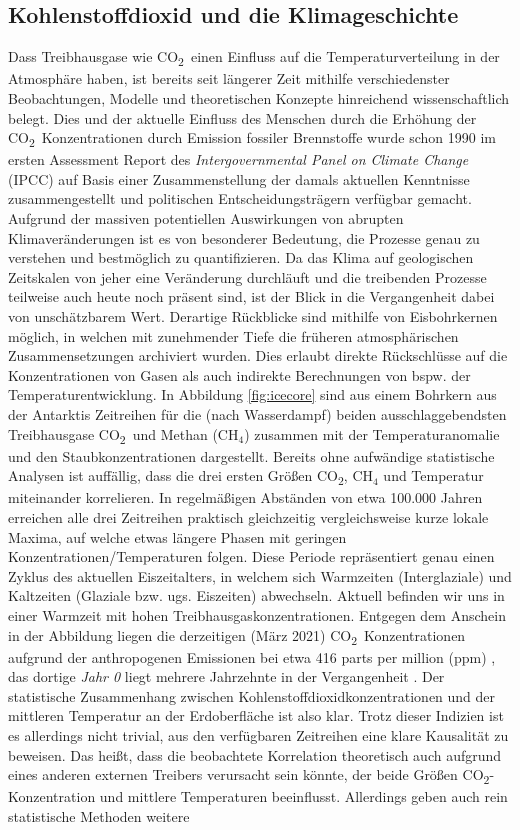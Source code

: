 \documentclass[12pt,a4paper,onecolumn,draft]{scrartcl}
\newcommand{\cotwo}{CO\textsubscript{2}}
\begin{document}
\subsection{Kohlenstoffdioxid und die Klimageschichte} \label{sec:Klima}
Dass Treibhausgase wie \cotwo \ einen Einfluss auf die Temperaturverteilung in der Atmosphäre haben, ist bereits seit längerer Zeit mithilfe verschiedenster Beobachtungen, Modelle und theoretischen Konzepte hinreichend wissenschaftlich belegt. Dies und der aktuelle Einfluss des Menschen durch die Erhöhung der \cotwo \ Konzentrationen durch Emission fossiler Brennstoffe wurde schon 1990 im ersten Assessment Report des \textit{Intergovernmental Panel on Climate Change} (IPCC) auf Basis einer Zusammenstellung der damals aktuellen Kenntnisse zusammengestellt und politischen Entscheidungsträgern verfügbar gemacht. Aufgrund der massiven potentiellen Auswirkungen von abrupten Klimaveränderungen \citep{IPCCpol.2018} ist es von besonderer Bedeutung, die Prozesse genau zu verstehen und bestmöglich zu quantifizieren. Da das Klima auf geologischen Zeitskalen von jeher eine Veränderung durchläuft und die  treibenden Prozesse teilweise auch heute noch präsent sind, ist der Blick in die Vergangenheit dabei von unschätzbarem Wert. Derartige Rückblicke sind mithilfe von Eisbohrkernen möglich, in welchen mit zunehmender Tiefe die früheren atmosphärischen Zusammensetzungen archiviert wurden. Dies erlaubt direkte Rückschlüsse auf die Konzentrationen von Gasen als auch indirekte Berechnungen von bspw. der Temperaturentwicklung. In Abbildung \ref{fig:icecore} sind aus einem Bohrkern aus der Antarktis Zeitreihen für die (nach Wasserdampf) beiden ausschlaggebendsten Treibhausgase \cotwo \ und Methan (CH$_4$) zusammen mit der Temperaturanomalie und den Staubkonzentrationen dargestellt. Bereits ohne aufwändige statistische Analysen ist auffällig, dass die drei ersten Größen \cotwo , CH$_4$ und Temperatur miteinander korrelieren. In regelmäßigen Abständen von etwa 100.000 Jahren erreichen alle drei Zeitreihen praktisch gleichzeitig vergleichsweise kurze lokale Maxima, auf welche etwas längere Phasen mit geringen Konzentrationen/Temperaturen folgen. Diese Periode repräsentiert genau einen Zyklus des aktuellen Eiszeitalters, in welchem sich Warmzeiten (Interglaziale) und Kaltzeiten (Glaziale bzw. ugs. Eiszeiten) abwechseln. Aktuell befinden wir uns in einer Warmzeit mit hohen Treibhausgaskonzentrationen. Entgegen dem Anschein in der Abbildung liegen die derzeitigen (März 2021) \cotwo \ Konzentrationen aufgrund der anthropogenen Emissionen bei etwa 416 parts per million (ppm) \citep{NASA.06.05.2021}, das dortige \textit{Jahr 0} liegt mehrere Jahrzehnte in der Vergangenheit \citep{Luthi.2008}. Der statistische Zusammenhang zwischen Kohlenstoffdioxidkonzentrationen und der mittleren Temperatur an der Erdoberfläche ist also klar.  Trotz dieser Indizien ist es allerdings nicht trivial, aus den verfügbaren Zeitreihen eine klare Kausalität zu beweisen. Das heißt, dass die beobachtete Korrelation theoretisch auch aufgrund eines anderen externen Treibers verursacht sein könnte, der beide Größen \cotwo -Konzentration und mittlere Temperaturen beeinflusst. Allerdings geben auch rein statistische Methoden \citep{Stips.2016} weitere 
\end{document}
